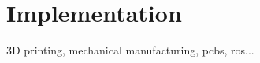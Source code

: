 \chapter{Implementation} %
\label{cha:implementation}

3D printing, mechanical manufacturing, pcbs, ros...



